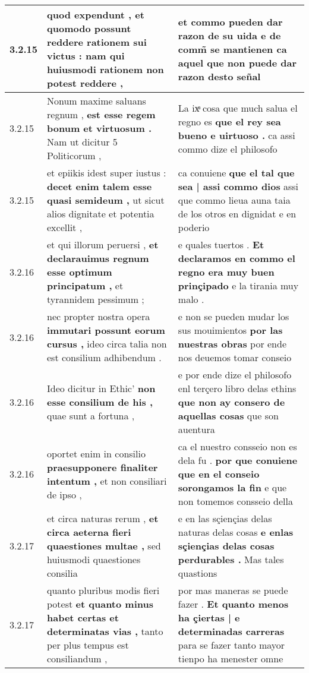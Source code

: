 \begin{tabular}{|p{1cm}|p{6.5cm}|p{6.5cm}|}
3.2.15 & quod expendunt , et quomodo possunt \textbf{ reddere rationem sui victus : } nam qui huiusmodi rationem non potest reddere , & et commo pueden dar razon de su uida \textbf{ e de comm̃ se mantienen } ca aquel que non puede dar razon desto señal \\\hline
3.2.15 & Nonum maxime saluans regnum , \textbf{ est esse regem bonum et virtuosum . } Nam ut dicitur 5 Politicorum , & La ixͣ cosa que much salua el regno es \textbf{ que el rey sea bueno e uirtuoso . } ca assi commo dize el philosofo \\\hline
3.2.15 & et epiikis idest super iustus : \textbf{ decet enim talem esse quasi semideum , } ut sicut alios dignitate et potentia excellit , & ca conuiene \textbf{ que el tal que sea | assi commo dios } assi que commo lieua auna taia de los otros en dignidat e en poderio \\\hline
3.2.16 & et qui illorum peruersi , \textbf{ et declarauimus regnum esse optimum principatum , } et tyrannidem pessimum ; & e quales tuertos . \textbf{ Et declaramos en commo el regno era muy buen prinçipado } e la tirania muy malo . \\\hline
3.2.16 & nec propter nostra opera \textbf{ immutari possunt eorum cursus , } ideo circa talia non est consilium adhibendum . & e non se pueden mudar los sus mouimientos \textbf{ por las nuestras obras } por ende nos deuemos tomar conseio \\\hline
3.2.16 & Ideo dicitur in Ethic’ \textbf{ non esse consilium de his , } quae sunt a fortuna , & e por ende dize el philosofo enl terçero libro delas ethins \textbf{ que non ay consero de aquellas cosas } que son auentura \\\hline
3.2.16 & oportet enim in consilio \textbf{ praesupponere finaliter intentum , } et non consiliari de ipso , & ca el nuestro consseio non es dela fu . \textbf{ por que conuiene que en el conseio sorongamos la fin } e que non tomemos consseio della \\\hline
3.2.17 & et circa naturas rerum , \textbf{ et circa aeterna fieri quaestiones multae , } sed huiusmodi quaestiones consilia & e en las sçiençias delas naturas delas cosas \textbf{ e enlas sçiençias delas cosas perdurables . } Mas tales quastions \\\hline
3.2.17 & quanto pluribus modis fieri potest \textbf{ et quanto minus habet certas et determinatas vias , } tanto per plus tempus est consiliandum , & por mas maneras se puede fazer . \textbf{ Et quanto menos ha çiertas | e determinadas carreras } para se fazer tanto mayor tienpo ha menester omne \\\hline

\end{tabular}
